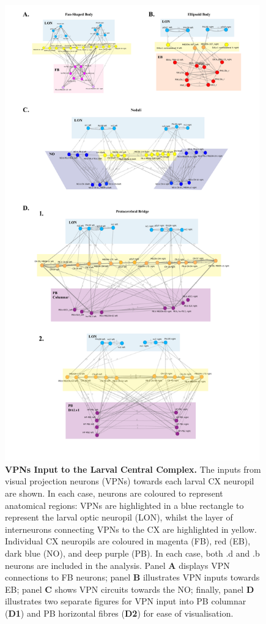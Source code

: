     \begin{figure}[H]
        \centering
        \includegraphics[width=11cm]{Figs/CX/VPNstoCX.pdf}
        \caption[Visual Inputs via VPNs to larval Central Complex Neuropils]{\textbf{VPNs Input to the Larval Central Complex.} The inputs from visual projection neurons (VPNs) towards each larval CX neuropil are shown. In each case, neurons are coloured to represent anatomical regions: VPNs are highlighted in a blue rectangle to represent the larval optic neuropil (LON), whilst the layer of interneurons connecting VPNs to the CX are highlighted in yellow. Individual CX neuropils are coloured in magenta (FB), red (EB), dark blue (NO), and deep purple (PB). In each case, both .d and .b neurons are included in the analysis. Panel \textbf{A} displays VPN connections to FB neurons; panel \textbf{B} illustrates VPN inputs towards EB; panel \textbf{C} shows VPN circuits towards the NO; finally, panel \textbf{D} illustrates two separate figures for VPN input into PB columnar (\textbf{D1}) and PB horizontal fibres (\textbf{D2}) for ease of visualisation.}
        \label{VPNs}
    \end{figure}

